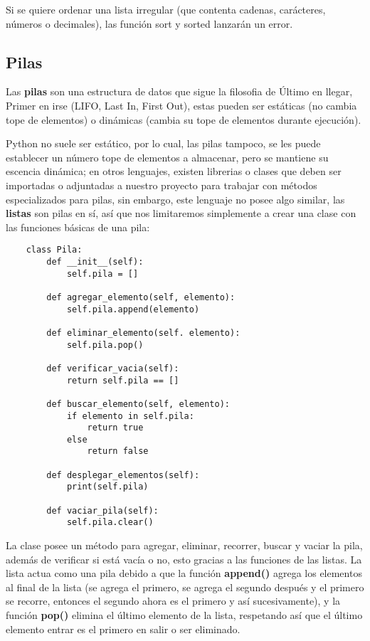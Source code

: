 Si se quiere ordenar una lista irregular (que contenta cadenas, carácteres, números o decimales), las función sort y sorted lanzarán un error.


\subsection{Pilas}
\hspace{0.55cm}Las \textbf{pilas} son una estructura de datos que sigue la filosofia de Último en llegar, Primer en irse (LIFO, Last In, First Out), estas pueden ser estáticas (no cambia tope de elementos) o dinámicas (cambia su tope de elementos durante ejecución).

Python no suele ser estático, por lo cual, las pilas tampoco, se les puede establecer un número tope de elementos a almacenar, pero se mantiene su escencia dinámica; en otros lenguajes, existen librerias o clases que deben ser importadas o adjuntadas a nuestro proyecto para trabajar con métodos especializados para pilas, sin embargo, este lenguaje no posee algo similar, las \textbf{listas} son pilas en sí, así que nos limitaremos simplemente a crear una clase con las funciones básicas de una pila:
\begin{lstlisting}
	class Pila:
		def __init__(self):
			self.pila = []
			
		def agregar_elemento(self, elemento):
			self.pila.append(elemento)
			
		def eliminar_elemento(self. elemento):
			self.pila.pop()
			
		def verificar_vacia(self):
			return self.pila == []
			
		def buscar_elemento(self, elemento):
			if elemento in self.pila:
				return true
			else
				return false
				
		def desplegar_elementos(self):
			print(self.pila)
			
		def vaciar_pila(self):
			self.pila.clear()
\end{lstlisting}

La clase posee un método para agregar, eliminar, recorrer, buscar y vaciar la pila, además de verificar si está vacía o no, esto gracias a las funciones de las listas. La lista actua como una pila debido a que la función \textbf{append()} agrega los elementos al final de la lista (se agrega el primero, se agrega el segundo después y el primero se recorre, entonces el segundo ahora es el primero y así sucesivamente), y la función \textbf{pop()} elimina el último elemento de la lista, respetando así que el último elemento entrar es el primero en salir o ser eliminado.



